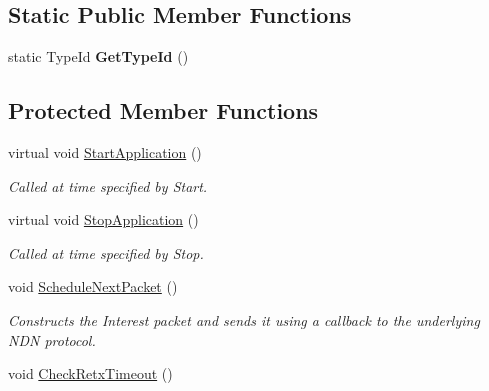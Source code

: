\subsection*{Static Public Member Functions}
\begin{DoxyCompactItemize}
\item 
static Type\+Id {\bfseries Get\+Type\+Id} ()\hypertarget{classns3_1_1ndn_1_1Subscriber_a990d941c64d34c6ac2b402279336ea82}{}\label{classns3_1_1ndn_1_1Subscriber_a990d941c64d34c6ac2b402279336ea82}

\end{DoxyCompactItemize}
\subsection*{Protected Member Functions}
\begin{DoxyCompactItemize}
\item 
virtual void \hyperlink{classns3_1_1ndn_1_1Subscriber_aeb069ea76d7203c8206066746775d8c8}{Start\+Application} ()\hypertarget{classns3_1_1ndn_1_1Subscriber_aeb069ea76d7203c8206066746775d8c8}{}\label{classns3_1_1ndn_1_1Subscriber_aeb069ea76d7203c8206066746775d8c8}

\begin{DoxyCompactList}\small\item\em Called at time specified by Start. \end{DoxyCompactList}\item 
virtual void \hyperlink{classns3_1_1ndn_1_1Subscriber_a03abd87c94d4e545abf70e545cb5e51d}{Stop\+Application} ()\hypertarget{classns3_1_1ndn_1_1Subscriber_a03abd87c94d4e545abf70e545cb5e51d}{}\label{classns3_1_1ndn_1_1Subscriber_a03abd87c94d4e545abf70e545cb5e51d}

\begin{DoxyCompactList}\small\item\em Called at time specified by Stop. \end{DoxyCompactList}\item 
void \hyperlink{classns3_1_1ndn_1_1Subscriber_ac327c79bcec09c054a79ed0eafaaa701}{Schedule\+Next\+Packet} ()\hypertarget{classns3_1_1ndn_1_1Subscriber_ac327c79bcec09c054a79ed0eafaaa701}{}\label{classns3_1_1ndn_1_1Subscriber_ac327c79bcec09c054a79ed0eafaaa701}

\begin{DoxyCompactList}\small\item\em Constructs the Interest packet and sends it using a callback to the underlying N\+DN protocol. \end{DoxyCompactList}\item 
void \hyperlink{classns3_1_1ndn_1_1Subscriber_a222ee83f9c41902f8e96c889b3555c89}{Check\+Retx\+Timeout} ()\hypertarget{classns3_1_1ndn_1_1Subscriber_a222ee83f9c41902f8e96c889b3555c89}{}\label{classns3_1_1ndn_1_1Subscriber_a222ee83f9c41902f8e96c889b3555c89}


\end{DoxyCompactItemize}
